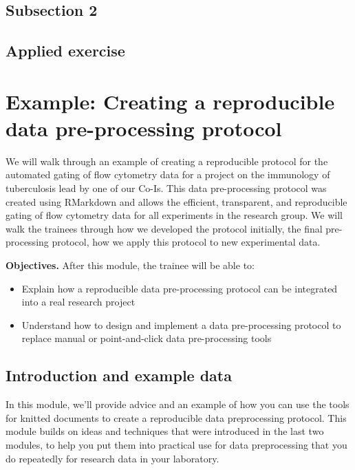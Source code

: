 \documentclass[]{tufte-book}
\providecommand{\tightlist}{%
  \setlength{\itemsep}{0pt}\setlength{\parskip}{0pt}}
\begin{document}
\hypertarget{subsection-2-8}{%
\subsection{Subsection 2}\label{subsection-2-8}}

\hypertarget{applied-exercise-7}{%
\subsection{Applied exercise}\label{applied-exercise-7}}

\hypertarget{example-creating-a-reproducible-data-pre-processing-protocol}{%
\section{Example: Creating a reproducible data pre-processing protocol}\label{example-creating-a-reproducible-data-pre-processing-protocol}}

We will walk through an example of creating a reproducible protocol for the
automated gating of flow cytometry data for a project on the immunology of
tuberculosis lead by one of our Co-Is. This data pre-processing protocol was
created using RMarkdown and allows the efficient, transparent, and reproducible
gating of flow cytometry data for all experiments in the research group. We will
walk the trainees through how we developed the protocol initially, the final
pre-processing protocol, how we apply this protocol to new experimental data.

\textbf{Objectives.} After this module, the trainee will be able to:

\begin{itemize}
\tightlist
\item
  Explain how a reproducible data pre-processing protocol can be integrated into
  a real research project
\item
  Understand how to design and implement a data pre-processing protocol to
  replace manual or point-and-click data pre-processing tools
\end{itemize}

\hypertarget{introduction-and-example-data}{%
\subsection{Introduction and example data}\label{introduction-and-example-data}}

In this module, we'll provide advice and an example of how you can use the
tools for knitted documents to create a reproducible data preprocessing
protocol. This module builds on ideas and techniques that were introduced
in the last two modules, to help you put them into practical use for
data preprocessing that you do repeatedly for research data in your
laboratory.
\end{document}
